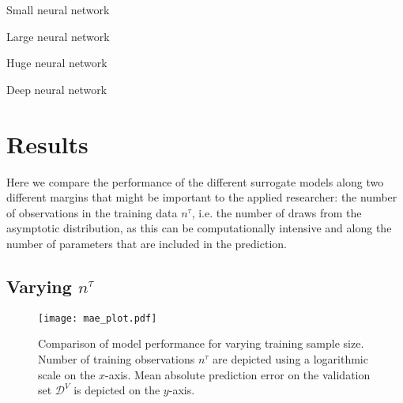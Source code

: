 \documentclass[a4paper, 12pt]{article}
\newcommand{\sciebopath}{/home/tm/sciebo/uni-master/master-thesis/structUncertainty/}
\begin{document}
\begin{table}[!h]
\footnotesize{

\caption{Small neural network}
}
\end{table}

\begin{table}[!h]
\footnotesize{

\caption{Large neural network}
}
\end{table}

\begin{table}[!h]
\footnotesize{

\caption{Huge neural network}
}
\end{table}

\begin{table}[!h]
\footnotesize{

\caption{Deep neural network}
}
\end{table}

%


\section{Results}

Here we compare the performance of the different surrogate models along two different margins that might be important to the applied researcher: the number of observations in the training data $n^\tau$, i.e. the number of draws from the asymptotic distribution, as this can be computationally intensive and along the number of parameters that are included in the prediction.

\subsection{Varying $n^\tau$}

\begin{figure}[h!]
\centering
\texttt{[image: mae\_plot.pdf]}
\caption{\small{Comparison of model performance for varying training sample size. Number of training observations $n^\tau$ are depicted using a logarithmic scale on the $x$-axis. Mean absolute prediction error on the validation set $\mathcal{D}^V$ is depicted on the $y$-axis.}}
\end{figure}
\end{document}
